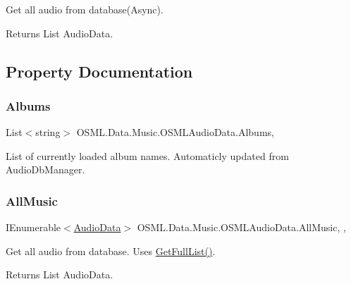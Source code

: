 Get all audio from database(\+Async). 

\begin{DoxyReturn}{Returns}
List Audio\+Data. 
\end{DoxyReturn}


\subsection{Property Documentation}
\mbox{\label{classOSML_1_1Data_1_1Music_1_1OSMLAudioData_aa8a7c659bffbc411d7b463de7c64b79c}} 
\subsubsection{\texorpdfstring{Albums}{Albums}}
{\footnotesize\ttfamily List$<$string$>$ O\+S\+M\+L.\+Data.\+Music.\+O\+S\+M\+L\+Audio\+Data.\+Albums\hspace{0.3cm}{\ttfamily [static]}, {\ttfamily [get]}}



List of currently loaded album names. Automaticly updated from Audio\+Db\+Manager. 

\mbox{\label{classOSML_1_1Data_1_1Music_1_1OSMLAudioData_a494a7af2d4115f352e35995f70027a12}} 
\subsubsection{\texorpdfstring{AllMusic}{AllMusic}}
{\footnotesize\ttfamily I\+Enumerable$<$\mbox{\hyperlink{classOSML_1_1Media_1_1AudioData}{Audio\+Data}}$>$ O\+S\+M\+L.\+Data.\+Music.\+O\+S\+M\+L\+Audio\+Data.\+All\+Music\hspace{0.3cm}{\ttfamily [static]}, {\ttfamily [get]}, {\ttfamily [set]}}



Get all audio from database. Uses \mbox{\hyperlink{classOSML_1_1Data_1_1Music_1_1OSMLAudioData_a34edf0c6c48e34a22ee634a35e280c74}{Get\+Full\+List()}}. 

\begin{DoxyReturn}{Returns}
List Audio\+Data. 
\end{DoxyReturn}
\mbox{\label{classOSML_1_1Data_1_1Music_1_1OSMLAudioData_acfcc0260b0e47fbc31d8860bdea51eb2}} 

